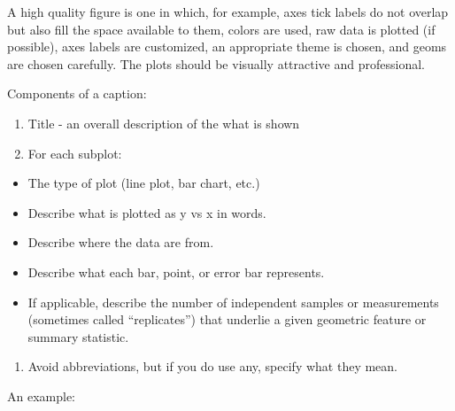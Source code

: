 \documentclass[
]{krantz}
\providecommand{\tightlist}{%
  \setlength{\itemsep}{0pt}\setlength{\parskip}{0pt}}
\begin{document}
A high quality figure is one in which, for example, axes tick labels do not overlap but also fill the space available to them, colors are used, raw data is plotted (if possible), axes labels are customized, an appropriate theme is chosen, and geoms are chosen carefully. The plots should be visually attractive and professional.

Components of a caption:

\begin{enumerate}
\def\labelenumi{\arabic{enumi}.}
\tightlist
\item
  Title - an overall description of the what is shown
\item
  For each subplot:
\end{enumerate}

\begin{itemize}
\tightlist
\item
  The type of plot (line plot, bar chart, etc.)
\item
  Describe what is plotted as y vs x in words.
\item
  Describe where the data are from.
\item
  Describe what each bar, point, or error bar represents.
\item
  If applicable, describe the number of independent samples or measurements (sometimes called ``replicates'') that underlie a given geometric feature or summary statistic.
\end{itemize}

\begin{enumerate}
\def\labelenumi{\arabic{enumi}.}
\setcounter{enumi}{2}
\tightlist
\item
  Avoid abbreviations, but if you do use any, specify what they mean.
\end{enumerate}

An example:
\end{document}
